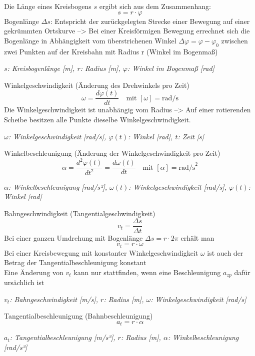 \documentclass[a4paper,10pt]{article}
\newenvironment{displayformula}
{
	\begin{framed}
		\color{formulaColor}
	}
	{\end{framed}}
\newcommand{\formulalegend}[1]{%
	\par\vspace{0.5ex}%
	{{\color{legendColor}\RaggedRight\small\textit{#1}}}%
	\par\vspace{1.5ex}%
}
\begin{document}
\begin{displayformula}
	Die Länge eines Kreisbogens \( s \) ergibt sich aus dem Zusammenhang:
	\[
	s = r \cdot \varphi 
	\]
	Bogenlänge $\Delta s$: Entspricht der zurückgelegten Strecke einer Bewegung auf einer gekrümmten Ortskurve --> Bei einer Kreisförmigen Bewegung errechnet sich die Bogenlänge in Abhängigkeit vom überstrichenen Winkel $\Delta \varphi = \varphi - \varphi_0$ zwischen zwei Punkten auf der Kreisbahn mit Radius r (Winkel im Bogenmaß)
\end{displayformula}
\formulalegend{
	\( s \): Kreisbogenlänge [m], \( r \): Radius [m], \( \varphi \): Winkel im Bogenmaß [rad]
}

\begin{displayformula}
	Winkelgeschwindigkeit (Änderung des Drehwinkels pro Zeit)
	\[
	\omega = \frac{d\varphi(t)}{dt} \quad \text{mit } [\omega] = \text{rad/s}
	\]
	Die Winkelgeschwindigkeit ist unabhängig vom Radius --> Auf einer rotierenden Scheibe besitzen alle Punkte dieselbe Winkelgeschwindigkeit.
\end{displayformula}
\formulalegend{
	\( \omega \): Winkelgeschwindigkeit [rad/s], \( \varphi(t) \): Winkel [rad], \( t \): Zeit [s]
}

\begin{displayformula}
	Winkelbeschleunigung (Änderung der Winkelgeschwindigkeit pro Zeit)
	\[
	\alpha = \frac{d^2 \varphi(t)}{dt^2} = \frac{d\omega(t)}{dt} \quad \text{mit } [\alpha] = \text{rad/s}^2
	\]
\end{displayformula}
\formulalegend{
	\( \alpha \): Winkelbeschleunigung [rad/s²], \( \omega(t) \): Winkelgeschwindigkeit [rad/s], \( \varphi(t) \): Winkel [rad]
}

\begin{displayformula}
	Bahngeschwindigkeit (Tangentialgeschwindigkeit)
	\[
	v_t = \frac{\Delta s}{\Delta t}
	\]
	Bei einer ganzen Umdrehung mit Bogenlänge $\Delta s = r \cdot 2 \pi$ erhält man
	\[
	v_t = r \cdot \omega
	\]
	Bei einer Kreisbewegung mit konstanter Winkelgeschwindigkeit $\omega$ ist auch der Betrag der Tangentialbeschleunigung konstant \\
	Eine Änderung von $v_t$ kann nur stattfinden, wenn eine Beschleunigung $a_{zp}$ dafür ursächlich ist
\end{displayformula}
\formulalegend{
	\( v_t \): Bahngeschwindigkeit [m/s], \( r \): Radius [m], \( \omega \): Winkelgeschwindigkeit [rad/s]
}

\begin{displayformula}
	Tangentialbeschleunigung (Bahnbeschleunigung)
	\[
	a_t = r \cdot \alpha
	\]
\end{displayformula}
\formulalegend{
	\( a_t \): Tangentialbeschleunigung [m/s²], \( r \): Radius [m], \( \alpha \): Winkelbeschleunigung [rad/s²]
}
\end{document}
